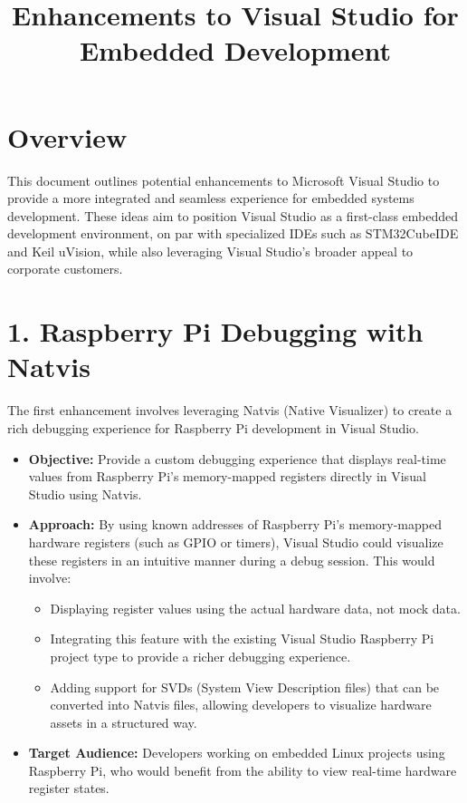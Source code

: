 \documentclass{article}
\title{Enhancements to Visual Studio for Embedded Development}
\author{}
\date{}
\begin{document}
\maketitle

\section*{Overview}

This document outlines potential enhancements to Microsoft Visual Studio to provide a more integrated and seamless experience for embedded systems development. These ideas aim to position Visual Studio as a first-class embedded development environment, on par with specialized IDEs such as STM32CubeIDE and Keil uVision, while also leveraging Visual Studio’s broader appeal to corporate customers. 

\section*{1. Raspberry Pi Debugging with Natvis}

The first enhancement involves leveraging Natvis (Native Visualizer) to create a rich debugging experience for Raspberry Pi development in Visual Studio. 

\begin{itemize}
    \item \textbf{Objective:} Provide a custom debugging experience that displays real-time values from Raspberry Pi's memory-mapped registers directly in Visual Studio using Natvis.
    \item \textbf{Approach:} By using known addresses of Raspberry Pi's memory-mapped hardware registers (such as GPIO or timers), Visual Studio could visualize these registers in an intuitive manner during a debug session. This would involve:
    \begin{itemize}
        \item Displaying register values using the actual hardware data, not mock data.
        \item Integrating this feature with the existing Visual Studio Raspberry Pi project type to provide a richer debugging experience.
        \item Adding support for SVDs (System View Description files) that can be converted into Natvis files, allowing developers to visualize hardware assets in a structured way.
    \end{itemize}
    \item \textbf{Target Audience:} Developers working on embedded Linux projects using Raspberry Pi, who would benefit from the ability to view real-time hardware register states.
\end{itemize}
\end{document}
